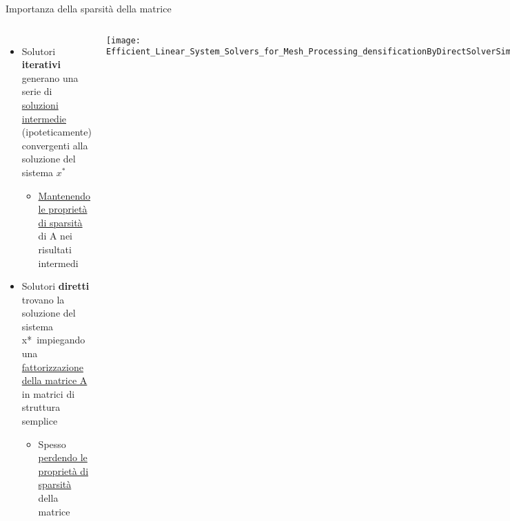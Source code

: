 \begin{frame} {Importanza della sparsità della matrice}
\subtitle{solutori iterativi vs diretti}
\begin{columns}
	\begin{itemize}
		\item	Solutori {\bf iterativi} generano una serie di \underline{soluzioni intermedie}\\
		(ipoteticamente) convergenti alla soluzione del sistema $x^{\ast}$
		\begin{itemize}
			\item	\underline{Mantenendo le proprietà di sparsità} di A nei risultati intermedi
		\end{itemize}
		\pause
		\item	Solutori {\bf diretti} trovano la soluzione del sistema x* impiegando 
		una \underline{fattorizzazione della matrice A} in matrici di struttura semplice 
		\begin{itemize}
			\item	Spesso \underline{perdendo le proprietà di sparsità} della matrice
		\end{itemize}
	\end{itemize}
	\texttt{[image: Efficient\_Linear\_System\_Solvers\_for\_Mesh\_Processing\_densificationByDirectSolverSimplied.svg.png]}
\end{columns}
\end{frame}


